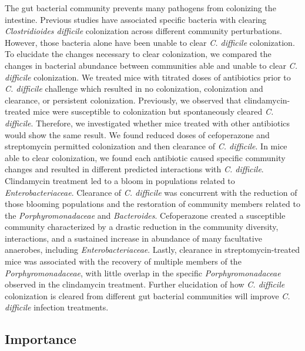 \documentclass[11pt,]{article}
\begin{document}
The gut bacterial community prevents many pathogens from colonizing the
intestine. Previous studies have associated specific bacteria with
clearing \emph{Clostridioides difficile} colonization across different
community perturbations. However, those bacteria alone have been unable
to clear \emph{C. difficile} colonization. To elucidate the changes
necessary to clear colonization, we compared the changes in bacterial
abundance between communities able and unable to clear \emph{C.
difficile} colonization. We treated mice with titrated doses of
antibiotics prior to \emph{C. difficile} challenge which resulted in no
colonization, colonization and clearance, or persistent colonization.
Previously, we observed that clindamycin-treated mice were susceptible
to colonization but spontaneously cleared \emph{C. difficile}.
Therefore, we investigated whether mice treated with other antibiotics
would show the same result. We found reduced doses of cefoperazone and
streptomycin permitted colonization and then clearance of \emph{C.
difficile}. In mice able to clear colonization, we found each antibiotic
caused specific community changes and resulted in different predicted
interactions with \emph{C. difficile}. Clindamycin treatment led to a
bloom in populations related to \emph{Enterobacteriaceae}. Clearance of
\emph{C. difficile} was concurrent with the reduction of those blooming
populations and the restoration of community members related to the
\emph{Porphyromonadaceae} and \emph{Bacteroides}. Cefoperazone created a
susceptible community characterized by a drastic reduction in the
community diversity, interactions, and a sustained increase in abundance
of many facultative anaerobes, including \emph{Enterobacteriaceae}.
Lastly, clearance in streptomycin-treated mice was associated with the
recovery of multiple members of the \emph{Porphyromonadaceae}, with
little overlap in the specific \emph{Porphyromonadaceae} observed in the
clindamycin treatment. Further elucidation of how \emph{C. difficile}
colonization is cleared from different gut bacterial communities will
improve \emph{C. difficile} infection treatments.

\newpage

\hypertarget{importance}{%
\subsection{Importance}\label{importance}}
\end{document}
